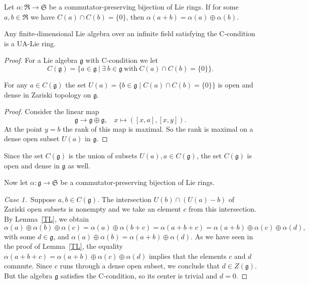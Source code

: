 \documentclass[10pt,a4paper]{amsart}
\def\RRR{\mathfrak{R}}
\def\SSS{\mathfrak{S}}
\def\ggg{\mathfrak{g}}
\begin{document}
\begin{lemma} 
\label{TL}
Let $\alpha\colon\RRR\to\SSS$ be a commutator-preserving bijection of Lie rings. If  
for some $a,b\in\RRR$ we have $C(a)\cap C(b)=\{0\}$, then $\alpha(a+b)=\alpha(a)\oplus\alpha(b)$. 
\end{lemma}

\begin{theorem}
\label{TCC}
Any finite-dimensional Lie algebra over an infinite field satisfying the C-condition is a UA-Lie ring.
\end{theorem} 

\begin{proof} 
For a Lie algebra $\mathfrak{g}$ with C-condition we let
$$
C(\mathfrak{g})=\{a\in\mathfrak{g}\ | \  \exists \ b\in\mathfrak{g} \ \text{with} \ C(a)\cap C(b)=\{0\}\}.
$$

\begin{lemma}
For any $a\in C(\mathfrak{g})$ the set $U(a)=\{b\in\mathfrak{g} \mid C(a)\cap C(b)=\{0\} \}$ is open and dense in Zariski topology on $\mathfrak{g}$.
\end{lemma}
%
\begin{proof}
Consider the linear map
$$
\mathfrak{g}\to\mathfrak{g}\oplus\mathfrak{g}, \ \ \ \  x\mapsto ([x,a], [x,y]). 
$$
At the point $y=b$ the rank of this map is maximal. So the rank is maximal on a dense open subset $U(a)$ in $\mathfrak{g}$.
\end{proof}

Since the set $C(\ggg)$ is the union of subsets $U(a), a\in C(\ggg)$, the set $C(\ggg)$ is open and dense in $\ggg$ as well. 

\smallskip

Now let $\alpha\colon\ggg\to\SSS$ be a commutator-preserving bijection of Lie rings.

\bigskip

{\it Case 1.}\ Suppose $a, b\in C(\mathfrak{g})$. The intersection $U(b)\cap(U(a)-b)$ of Zariski open subsets is nonempty and we take an element $c$ from this intersection.
By Lemma~\ref{TL}, we obtain
$$
\alpha(a)\oplus\alpha(b)\oplus\alpha(c)=\alpha(a)\oplus\alpha(b+c)=\alpha(a+b+c)=\alpha(a+b)\oplus\alpha(c)\oplus\alpha(d),
$$
with some $d\in\ggg$, and $\alpha(a)\oplus\alpha(b)=\alpha(a+b)\oplus\alpha(d)$. As we have seen in the proof of Lemma~\ref{TL},
the equality $\alpha(a+b+c)=\alpha(a+b)\oplus\alpha(c)\oplus\alpha(d)$ implies that the elements $c$ and $d$ commute. 
Since $c$ runs through a dense open subset, we conclude that $d\in Z(\ggg)$. But the algebra $\ggg$
satisfies the C-condition, so its center is trivial and $d=0$. 


\end{proof}
\end{document}
